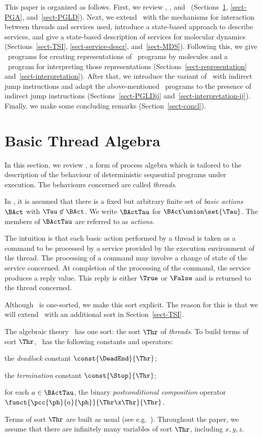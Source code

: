 \documentclass[fleqn]{llncs}
\begin{document}
This paper is organized as follows.
First, we review \BTA, \PGA, and \PGLD\ (Sections~\ref{sect-BTA},
\ref{sect-PGA}, and~\ref{sect-PGLD}).
Next, we extend \BTA\ with the mechanisms for interaction between
threads and services used, introduce a state-based approach to describe
services, and give a state-based description of services for molecular
dynamics (Sections~\ref{sect-TSI}, \ref{sect-service-descr},
and~\ref{sect-MDS}).
Following this, we give \PGA\ programs for creating representations of
\PGLD\ programs by molecules and a \PGA\ program for interpreting those
representations (Sections~\ref{sect-representation}
and~\ref{sect-interpretation}).
After that, we introduce the variant of \PGLD\ with indirect jump
instructions and adapt the above-mentioned \PGA\ programs to the
presence of indirect jump instructions (Sections~\ref{sect-PGLDij}
and~\ref{sect-interpretation-ij}).
Finally, we make some concluding remarks (Section~\ref{sect-concl}).


\section{Basic Thread Algebra}
\label{sect-BTA}

In this section, we review \BTA, a form of process algebra which is
tailored to the description of the behaviour of deterministic sequential
programs under execution.
The behaviours concerned are called \emph{threads}.

In \BTA, it is assumed that there is a fixed but arbitrary finite set of
\emph{basic actions} $\BAct$ with $\Tau \not\in \BAct$.
We write $\BActTau$ for $\BAct \union \set{\Tau}$.
The members of $\BActTau$ are referred to as \emph{actions}.

The intuition is that each basic action performed by a thread is taken
as a command to be processed by a service provided by the execution
environment of the thread.
The processing of a command may involve a change of state of the service
concerned.
At completion of the processing of the command, the service produces a
reply value.
This reply is either $\True$ or $\False$ and is returned to the thread
concerned.

Although \BTA\ is one-sorted, we make this sort explicit.
The reason for this is that we will extend \BTA\ with an additional sort
in Section~\ref{sect-TSI}.

The algebraic theory \BTA\ has one sort: the sort $\Thr$ of
\emph{threads}.
To build terms of sort $\Thr$, \BTA\ has the following constants and
operators:
\begin{iteml}
\item
the \emph{deadlock} constant $\const{\DeadEnd}{\Thr}$;
\item
the \emph{termination} constant $\const{\Stop}{\Thr}$;
\item
for each $a \in \BActTau$, the binary \emph{postconditional composition}
operator $\funct{\pcc{\ph}{a}{\ph}}{\linebreak[2]\Thr \x \Thr}{\Thr}$.
\end{iteml}
Terms of sort $\Thr$ are built as usual (see e.g.~\cite{ST99a,Wir90a}).
Throughout the paper, we assume that there are infinitely many variables
of sort $\Thr$, including $x,y,z$.
\end{document}
